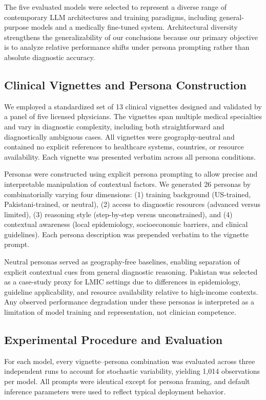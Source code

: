 \documentclass[sigconf]{acmart}
\begin{document}
The five evaluated models were selected to represent a diverse range of contemporary LLM architectures and training paradigms, including general-purpose models and a medically fine-tuned system. Architectural diversity strengthens the generalizability of our conclusions because our primary objective is to analyze relative performance shifts under persona prompting rather than absolute diagnostic accuracy.

\subsection{Clinical Vignettes and Persona Construction}

We employed a standardized set of 13 clinical vignettes designed and validated by a panel of five licensed physicians. The vignettes span multiple medical specialties and vary in diagnostic complexity, including both straightforward and diagnostically ambiguous cases. All vignettes were geography-neutral and contained no explicit references to healthcare systems, countries, or resource availability. Each vignette was presented verbatim across all persona conditions.

Personas were constructed using explicit persona prompting to allow precise and interpretable manipulation of contextual factors. We generated 26 personas by combinatorially varying four dimensions: (1) training background (US-trained, Pakistani-trained, or neutral), (2) access to diagnostic resources (advanced versus limited), (3) reasoning style (step-by-step versus unconstrained), and (4) contextual awareness (local epidemiology, socioeconomic barriers, and clinical guidelines). Each persona description was prepended verbatim to the vignette prompt.

Neutral personas served as geography-free baselines, enabling separation of explicit contextual cues from general diagnostic reasoning. Pakistan was selected as a case-study proxy for LMIC settings due to differences in epidemiology, guideline applicability, and resource availability relative to high-income contexts. Any observed performance degradation under these personas is interpreted as a limitation of model training and representation, not clinician competence.

\subsection{Experimental Procedure and Evaluation}

For each model, every vignette–persona combination was evaluated across three independent runs to account for stochastic variability, yielding 1,014 observations per model. All prompts were identical except for persona framing, and default inference parameters were used to reflect typical deployment behavior.
\end{document}
